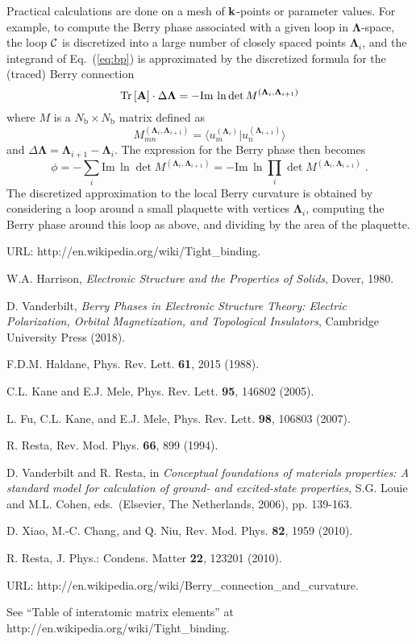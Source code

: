 \documentclass[11pt]{article}
\numberwithin{equation}{section} %
\def\beq{\begin{equation}}
\def\eeq{\end{equation}}
\newcommand{\equ}[1]{Eq.~(\ref{eq:#1})}
\renewcommand{\Im}{\textrm{Im}}
\def\ip#1#2{\langle #1 \vert #2 \rangle}
\def\A{{\bf A}}
\def\k{{\bf k}}
\def\bL{\mathbf{\Lambda}}
\def\Im{\textrm{Im}\,}
\def\Tr{\textrm{Tr}\,}
\def\cC{{\cal C}}
\def\Nb{N_\textrm{b}}
\begin{document}
Practical calculations are done on a mesh of $\k$-points or
parameter values.  For example, to compute the Berry phase
associated with a given loop in $\bL$-space, the loop $\cC$ is
discretized into a large number of closely spaced points
$\bL_i$, and the integrand of \equ{bp} is approximated
by the discretized formula for the (traced) Berry connection
%
\beq
\Tr[\A]\cdot\Delta\bL = -\Im\ln\det M^{(\bL_i,\bL_{i+1})}
\eeq
%
where $M$ is a $\Nb\times\Nb$ matrix defined as
%
\beq
M_{mn}^{(\bL_i,\bL_{i+1})} = \ip{u_m^{(\bL_i)}}{u_n^{(\bL_{i+1})}}
\eeq
%
and $\Delta\bL=\bL_{i+1}-\bL_i$.
The expression for the Berry phase then becomes
%
\beq
\phi=-\sum_i \Im\ln\det M^{(\bL_i,\bL_{i+1})}
    =-\Im\ln\prod_i\det M^{(\bL_i,\bL_{i+1})} \;.
\eeq
%
The discretized approximation to the local Berry curvature is
obtained by considering a loop around a small plaquette with
vertices $\bL_i$, computing the Berry phase around this loop as
above, and dividing by the area of the plaquette.

\begin{thebibliography}{0}

 URL:
http://en.wikipedia.org/wiki/Tight\_binding.

 W.A. Harrison, \textit{Electronic Structure and
the Properties of Solids}, Dover, 1980.

D. Vanderbilt,
\textit{Berry Phases in Electronic Structure Theory: Electric
Polarization, Orbital Magnetization, and Topological Insulators},
Cambridge University Press (2018).

 F.D.M. Haldane, Phys. Rev. Lett. {\bf 61}, 2015 (1988).

 C.L. Kane and E.J. Mele, Phys. Rev. Lett. {\bf 95}, 146802 (2005).

 L. Fu, C.L. Kane, and E.J. Mele, Phys. Rev. Lett. {\bf 98},
106803 (2007).

R. Resta, Rev. Mod. Phys. {\bf 66}, 899 (1994).

 D. Vanderbilt and R. Resta, 
in \textit{Conceptual foundations of materials
properties: A standard model for calculation of ground-
and excited-state properties,} S.G. Louie and M.L. Cohen,
eds.\ (Elsevier, The Netherlands, 2006), pp. 139-163.

 D. Xiao, M.-C. Chang, and Q. Niu, Rev. Mod. Phys.
{\bf 82}, 1959 (2010).

R. Resta, J. Phys.: Condens. Matter {\bf 22}, 123201 (2010).

 URL:
http://en.wikipedia.org/wiki/Berry\_connection\_and\_curvature.

 See ``Table of interatomic matrix elements''
at http://en.wikipedia.org/wiki/Tight\_binding.

\end{thebibliography}
\end{document}

